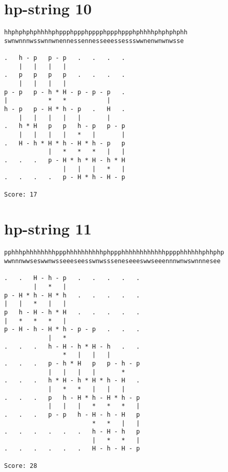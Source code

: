 \documentclass[a4paper,oneside,article,11pt]{memoir}
\begin{document}
\section*{hp-string 10}
\begin{lstlisting}[basicstyle=\ttfamily]
hhphphphphhhhphppphppphpppphppphppphphhhhphphphphh
swnwnnnwsswnnwnennessennesseeessessswwnenwnwnwsse

.   h - p   p - p   .   .   .   .  
    |   |   |   |                  
.   p   p   p   p   .   .   .   .  
    |   |   |   |                  
p - p   p - h * H - p - p - p   .  
|           *   *           |      
h - p   p - H * h - p   .   H   .  
    |   |   |   |   |       |      
.   h * H   p   p   h - p   p - p  
    |   |   |   |   *   |       |  
.   H - h * H * h - H * h - p   p  
            |   *   *   *   |   |  
.   .   .   p - H * h * H - h * H  
                |   |   |   *   |  
.   .   .   .   p - H * h - H - p 

Score: 17
\end{lstlisting}

\pagebreak

\section*{hp-string 11}
\begin{lstlisting}[basicstyle=\ttfamily]
pphhhphhhhhhhhppphhhhhhhhhhphppphhhhhhhhhhhhpppphhhhhhphhphp
wwnnnwwseswwnwsseeeseesswnwssseneseeeswwseeennnwnwswnnnesee

.   .   H - h - p   .   .   .   .   .  
        |   *   |                      
p - H * h - H * h   .   .   .   .   .  
|   |   *   |   |                      
p   h - H - h * H   .   .   .   .   .  
|   *   *   *   |                      
p - H - h - H * h - p - p   .   .   .  
            |   *                      
.   .   .   h - H - h * H - h   .   .  
                *   |   |   |          
.   .   .   p - h * H   p   p - h - p  
            |   |   |   |       *      
.   .   .   h * H - h * H * h - H   .  
            |   *   *   |   |   |      
.   .   .   p   h - H * h - H * h - p  
            |   |   |   *   *   *   |  
.   .   .   p - p   h - H - h - H   p  
                        *   *   |   |  
.   .   .   .   .   .   h - H - h   p  
                        |   *   *   |  
.   .   .   .   .   .   H - h - H - p  

Score: 28
\end{lstlisting}
\clearpage
\end{document}
